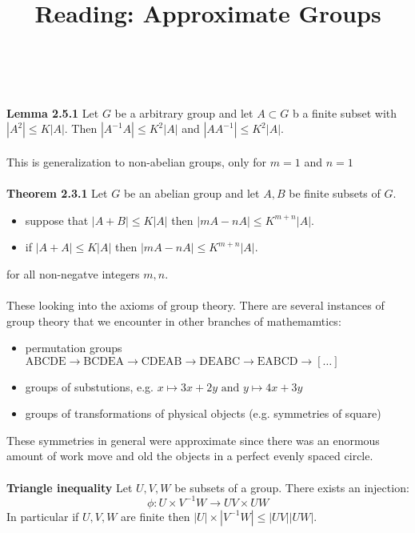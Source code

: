 \documentclass[12pt]{article}
\title{Reading: Approximate Groups}
\date{}
\begin{document}
\sffamily

\maketitle

{\fontsize{16pt}{16pt}\selectfont 

\noindent   \\ \\
 \textbf{Lemma 2.5.1} Let $G$ be a {\color{red!75!black}arbitrary} group and let $A \subset G$ b a finite subset with $|A^2| \leq K | A|$.  Then $|A^{-1}A|\leq K^2 |A|$ and $|A A^{-1}| \leq K^2|A|$. \\ \\
This is generalization to non-abelian groups, only for $m=1$ and $n=1$ \\ \\
\textbf{Theorem 2.3.1}  Let $G$ be an {\color{yellow!50!black}abelian} group and let $A, B$ be finite subsets of $G$.  
\begin{itemize}
	\item suppose that $|A + B| \leq K |A|$ then $|mA - nA| \leq K^{m+n}|A|$.
	\item if $|A+A| \leq K|A|$ then $|mA - nA| \leq K^{m+n}|A|$.
\end{itemize}
for all non-negatve integers $m,n$. \\ \\
These looking into the axioms of group theory.  There are several instances of group theory that we encounter in other branches of mathemamtics:
\begin{itemize}
\item permutation groups \\ $\text{ABCDE} \to \text{BCDEA} \to \text{CDEAB} \to \text{DEABC} \to \text{EABCD} \to [\dots]$
\item groups of substutions, e.g. 
$x \mapsto 3x + 2y \text{ and }y \mapsto 4x + 3y $
\item groups of transformations of physical objects (e.g. symmetries of square)
\end{itemize}
These symmetries in general were approximate since there was an enormous amount of work move and old the objects in a perfect evenly spaced circle. \\ \\
\textbf{Triangle inequality} Let $U,V,W$ be subsets of a group. There exists an injection:
$$ \phi: U \times V^{-1}W \to UV \times UW $$
In particular if $U,V,W$ are finite then $|U| \times |V^{-1}W| \leq |UV||UW|$. \\ \\ 
}
\end{document}
